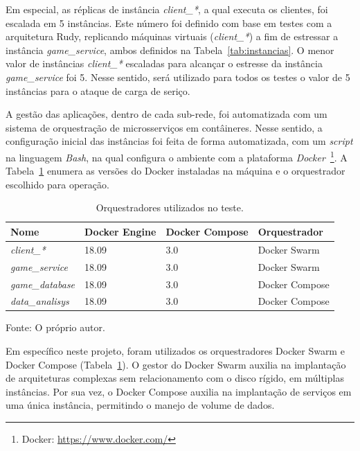 Em especial, as réplicas de instância \textit{client\_*}, a qual executa os clientes, foi escalada em 5 instâncias.
%
Este número foi definido com base em testes com a arquitetura Rudy, replicando máquinas virtuais (\textit{client\_*}) a fim de estressar a instância \textit{game\_service}, ambos definidos na Tabela~\ref{tab:instancias}.
%
O menor valor de instâncias \textit{client\_*} escaladas para alcançar o estresse da instância \textit{game\_service} foi 5.
%
Nesse sentido, será utilizado para todos os testes o valor de 5 instâncias para o ataque de carga de seriço.


A gestão das aplicações, dentro de cada sub-rede, foi automatizada com um sistema de orquestração de microsserviços em contâineres.
%
Nesse sentido, a configuração inicial das instâncias foi feita de forma automatizada, com um \textit{script} na linguagem \textit{Bash}, na qual configura o ambiente com a plataforma \textit{Docker}~\footnote{Docker: \url{https://www.docker.com/}}.
%
A Tabela~\ref{tab:docker_versoes} enumera as versões do Docker instaladas na máquina e o orquestrador escolhido para operação.

\begin{table}[htb!]
    \centering
    \caption{Orquestradores utilizados no teste.}
    \label{tab:docker_versoes}
    \begin{tabular}{|l|l|l|l|}
    \hline
        Nome                    & Docker Engine & Docker Compose & Orquestrador   \\ \hline
        \textit{client\_*}      & 18.09         & 3.0            & Docker Swarm   \\ \hline
        \textit{game\_service}  & 18.09         & 3.0            & Docker Swarm   \\ \hline
        \textit{game\_database} & 18.09         & 3.0            & Docker Compose \\ \hline
        \textit{data\_analisys} & 18.09         & 3.0            & Docker Compose \\ \hline
    \end{tabular}

    Fonte: O próprio autor.
\end{table}

Em específico neste projeto, foram utilizados os orquestradores Docker Swarm e Docker Compose (Tabela~\ref{tab:docker_versoes}).
%
O gestor do Docker Swarm auxilia na implantação de arquiteturas complexas sem relacionamento com o disco rígido, em múltiplas instâncias.
%
Por sua vez, o Docker Compose auxilia na implantação de serviços em uma única instância, permitindo o manejo de volume de dados.

